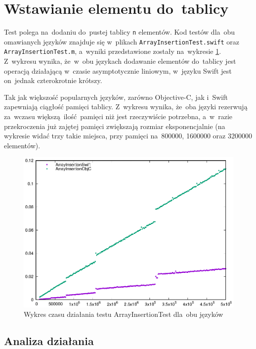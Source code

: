 \documentclass[mgr, shortabstract]{iithesis}
\newcommand{\swiftinline}[1]{
    \texttt{#1}
}
\begin{document}
\section{Wstawianie elementu do~tablicy}

Test polega na~dodaniu do~pustej tablicy \swiftinline{n} elementów. Kod testów dla~obu omawianych języków znajduje się w~plikach \texttt{ArrayInsertionTest.swift} oraz \texttt{ArrayInsertionTest.m}, a~wyniki przedstawione zostały na~wykresie \ref{p:array_insertion}. Z~wykresu wynika, że~w~obu językach dodawanie elementów do~tablicy jest operacją działającą w~czasie asymptotycznie liniowym, w~języku Swift jest on~jednak czterokrotnie krótszy.

Tak jak większość popularnych języków, zarówno Objective-C, jak i~Swift zapewniają ciągłość pamięci tablicy. Z~wykresu wynika, że~oba języki rezerwują za~wczasu większą ilość pamięci niż jest rzeczywiście potrzebna, a~w~razie przekroczenia już zajętej pamięci zwiększają rozmiar eksponencjalnie (na wykresie widać trzy takie miejsca, przy pamięci na~800000, 1600000 oraz 3200000 elementów).

\begin{figure}[h]
    \includegraphics{plots/ArrayInsertion.eps}
    \caption{Wykres czasu działania testu ArrayInsertionTest dla~obu języków}
    \label{p:array_insertion}
\end{figure}

\subsection{Analiza działania}
\end{document}
